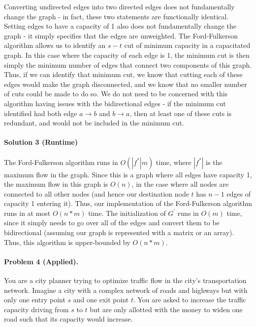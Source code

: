 \documentclass[11pt]{article}
\begin{document}
Converting undirected edges into two directed edges does not fundamentally change the graph - in fact, these two statements are functionally identical. Setting edges to have a capacity of 1 also does not fundamentally change the graph - it simply specifies that the edges are unweighted. The Ford-Fulkerson algorithm allows us to identify an $s-t$ cut of minimum capacity in a capacitated graph. In this case where the capacity of each edge is 1, the minimum cut is then simply the minimum number of edges that connect two components of this graph. Thus, if we can identify that minimum cut, we know that cutting each of these edges would make the graph disconnected, and we know that no smaller number of cuts could be made to do so. We do not need to be concerned with this algorithm having issues with the bidirectional edges - if the minimum cut identified had both edge $a \rightarrow b$ and $b \rightarrow a$, then at least one of these cuts is redundant, and would not be included in the minimum cut.

\paragraph{Solution 3 (Runtime)}

The Ford-Fulkerson algorithm runs in $O(|f^*|m)$ time, where $|f^*|$ is the maximum flow in the graph. Since this is a graph where all edges have capacity 1, the maximum flow in this graph is $O(n)$, in the case where all nodes are connected to all other nodes (and hence our destination node $t$ has $n-1$ edges of capacity 1 entering it). Thus, our implementation of the Ford-Fulkerson algorithm runs in at most $O(n * m)$ time. The initialization of $G^{'}$ runs in $O(m)$ time, since it simply needs to go over all of the edges and convert them to be bidirectional (assuming our graph is represented with a matrix or an array). Thus, this algorithm is upper-bounded by $O(n * m)$.


\newpage
\paragraph{Problem 4 (Applied).} You are a city planner trying to optimize traffic flow in the city's transportation network. Imagine a city with a complex network of roads and highways but with only one entry point $s$ and one exit point $t$. You are asked to increase the traffic capacity driving from $s$ to $t$ but are only allotted with the money to widen one road such that its capacity would increase. 
\end{document}

